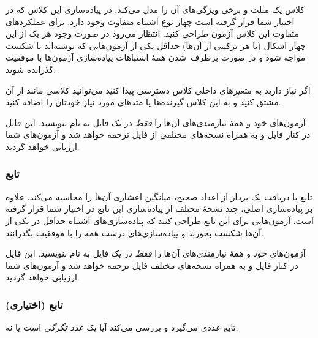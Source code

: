 \documentclass{utap}
\begin{document}
    کلاس  یک مثلث و برخی ویژگی‌های آن را مدل می‌کند.
    در پیاده‌سازی این کلاس که در اختیار شما قرار گرفته است چهار نوع اشتباه متفاوت وجود دارد. برای عملکردهای متفاوت این کلاس آزمون طراحی کنید. انتظار می‌رود در صورت وجود هر یک از این چهار اشکال (یا هر ترکیبی از آن‌ها) حداقل یکی از آزمون‌هایی که نوشته‌اید با شکست مواجه شود و در صورت برطرف~شدن همهٔ اشتباهات پیاده‌سازی آزمون‌ها با موفقیت گذرانده شوند.

    اگر نیاز دارید به متغیرهای داخلی کلاس  دسترسی پیدا کنید می‌توانید کلاسی مانند  از آن مشتق کنید و به این کلاس گیرنده‌ها یا متدهای مورد نیاز خودتان را اضافه کنید.

    آزمون‌های خود و همهٔ نیازمندی‌های آن‌ها را \textit{فقط} در یک فایل به نام  بنویسید. این فایل در کنار فایل  و به همراه نسخه‌های مختلفی از فایل  ترجمه خواهد شد و آزمون‌های شما ارزیابی خواهد گردید.
    
    \subsubsection[تابع get\_avg\_of\_vector]{تابع }

    تابع  با دریافت یک بردار از اعداد صحیح، میانگین اعشاری آن‌ها را محاسبه می‌کند.
    علاوه بر پیاده‌سازی اصلی، چند نسخهٔ مختلف از پیاده‌سازی این تابع در اختیار شما قرار گرفته است. آزمون‌هایی برای این تابع طراحی کنید که پیاده‌سازی‌های اشتباه حداقل در یکی از آن‌ها شکست بخورند و پیاده‌سازی‌های درست همه را با موفقیت بگذرانند.

    آزمون‌های خود و همهٔ نیازمندی‌های آن‌ها را \textit{فقط} در یک فایل به نام  بنویسید. این فایل در کنار فایل  و به همراه نسخه‌های مختلف فایل  ترجمه خواهد شد و آزمون‌های شما ارزیابی خواهد گردید.

    \subsubsection[تابع satisfies\_hailstone]{تابع  (اختیاری)}

    تابع  عددی می‌گیرد و بررسی می‌کند آیا یک \textit{عدد تگرگی}\cite{su} است یا نه.
\end{document}
